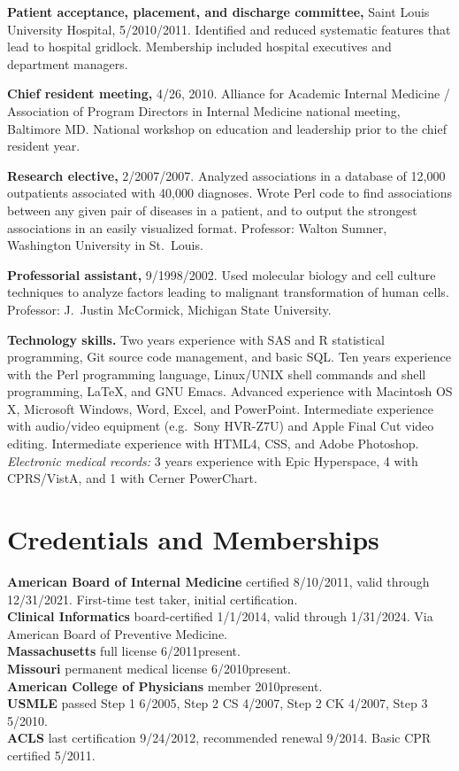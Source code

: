 \documentclass[12pt]{article}
\begin{document}
\textbf{Patient acceptance, placement, and discharge committee,} Saint
Louis University Hospital, 5/2010\ndash{}/2011. Identified
and reduced systematic features that lead to hospital gridlock.
Membership included hospital executives and department managers.


\textbf{Chief resident meeting,} 4/26, 2010. Alliance for
Academic Internal Medicine / Association of Program Directors in
Internal Medicine national meeting, Baltimore MD. National workshop on
education and leadership prior to the chief resident year.

\textbf{Research elective,} 2/2007/2007. Analyzed associations
in a database of 12,000 outpatients associated with 40,000 diagnoses.
Wrote Perl code to find associations between any given pair of
diseases in a patient, and to output the strongest associations in an
easily visualized format. Professor: Walton Sumner, Washington
University in St.\ Louis.

\textbf{Professorial assistant,} 9/1998/2002. Used molecular
biology and cell culture techniques to analyze factors leading to
malignant transformation of human cells. Professor: J.\ Justin
McCormick, Michigan State University.

\textbf{Technology skills.} Two years experience with SAS and R
statistical programming, Git source code management, and basic SQL.
Ten years experience with the Perl programming language, Linux/UNIX
shell commands and shell programming, \LaTeX, and GNU Emacs. Advanced
experience with Macintosh OS X, Microsoft Windows, Word, Excel, and
PowerPoint. Intermediate experience with audio/video equipment
(e.g.\ Sony HVR-Z7U) and Apple Final Cut video editing. Intermediate
experience with HTML4, CSS, and Adobe Photoshop. \emph{Electronic
  medical records:} 3 years experience with Epic Hyperspace, 4 with
CPRS/VistA, and 1 with Cerner PowerChart.


\section*{Credentials and Memberships}

\textbf{American Board of Internal Medicine} certified 8/10/2011,
valid through 12/31/2021. First-time test taker, initial
certification.\\
\textbf{Clinical Informatics} board-certified 1/1/2014, valid through
1/31/2024. Via American Board of Preventive Medicine.\\
\textbf{Massachusetts} full license 6/2011\ndash{}present.\\
\textbf{Missouri} permanent medical license 6/2010\ndash{}present.\\
\textbf{American College of Physicians} member 2010\ndash{}present.\\
\textbf{USMLE} passed Step 1 6/2005, Step 2 CS 4/2007, Step 2 CK 4/2007, Step 3
5/2010.\\
\textbf{ACLS} last certification 9/24/2012, recommended renewal
9/2014. Basic CPR certified 5/2011.
\end{document}
